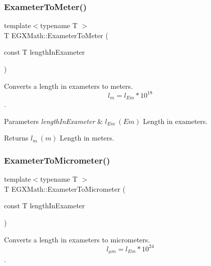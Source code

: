 \subsubsection{\texorpdfstring{Exameter\+To\+Meter()}{ExameterToMeter()}}
{\footnotesize\ttfamily template$<$typename T $>$ \\
T E\+G\+X\+Math\+::\+Exameter\+To\+Meter (\begin{DoxyParamCaption}\item[{const T}]{length\+In\+Exameter }\end{DoxyParamCaption})}



Converts a length in exameters to meters. \[ l_{m}=l_{Em} * 10^{18} \]. 


\begin{DoxyParams}{Parameters}
{\em length\+In\+Exameter} & $ l_{Em}\ (Em)$ Length in exameters. \\
\hline
\end{DoxyParams}
\begin{DoxyReturn}{Returns}
$ l_{m}\ (m)$ Length in meters. 
\end{DoxyReturn}
\mbox{\label{group___e_g_x_math-_conversions-_length_conversions-_s_i-_exameter-_s_i_gaee4a8b1fa77d023e7db7180e62646388}} 
\subsubsection{\texorpdfstring{Exameter\+To\+Micrometer()}{ExameterToMicrometer()}}
{\footnotesize\ttfamily template$<$typename T $>$ \\
T E\+G\+X\+Math\+::\+Exameter\+To\+Micrometer (\begin{DoxyParamCaption}\item[{const T}]{length\+In\+Exameter }\end{DoxyParamCaption})}



Converts a length in exameters to micrometers. \[ l_{\mu m}=l_{Em} * 10^{24} \]. 

